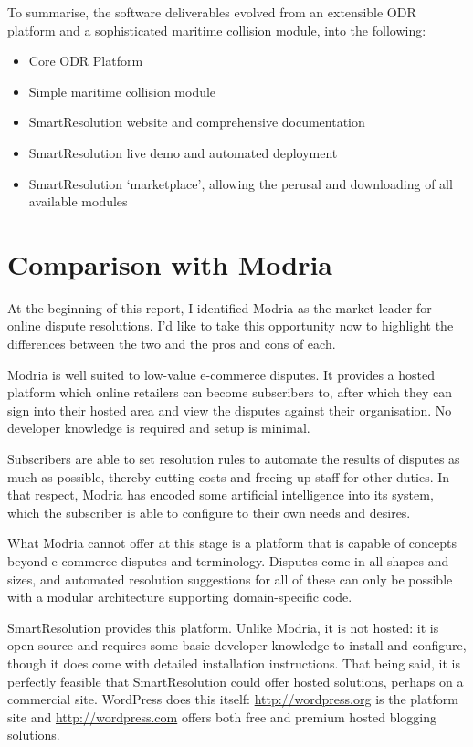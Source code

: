 To summarise, the software deliverables evolved from an extensible ODR platform and a sophisticated maritime collision module, into the following:

\begin{itemize}
\item Core ODR Platform
\item Simple maritime collision module
\item SmartResolution website and comprehensive documentation
\item SmartResolution live demo and automated deployment
\item SmartResolution `marketplace', allowing the perusal and downloading of all available modules
\end{itemize}

\section{Comparison with Modria}

At the beginning of this report, I identified Modria as the market leader for online dispute resolutions. I'd like to take this opportunity now to highlight the differences between the two and the pros and cons of each.

Modria is well suited to low-value e-commerce disputes. It provides a hosted platform which online retailers can become subscribers to, after which they can sign into their hosted area and view the disputes against their organisation. No developer knowledge is required and setup is minimal.

Subscribers are able to set resolution rules to automate the results of disputes as much as possible, thereby cutting costs and freeing up staff for other duties. In that respect, Modria has encoded some artificial intelligence into its system, which the subscriber is able to configure to their own needs and desires.

What Modria cannot offer at this stage is a platform that is capable of concepts beyond e-commerce disputes and terminology. Disputes come in all shapes and sizes, and  automated resolution suggestions for all of these can only be possible with a modular architecture supporting domain-specific code.

SmartResolution provides this platform. Unlike Modria, it is not hosted: it is open-source and requires some basic developer knowledge to install and configure, though it does come with detailed installation instructions. That being said, it is perfectly feasible that SmartResolution could offer hosted solutions, perhaps on a commercial site. WordPress does this itself: \url{http://wordpress.org} is the platform site and \url{http://wordpress.com} offers both free and premium hosted blogging solutions.

